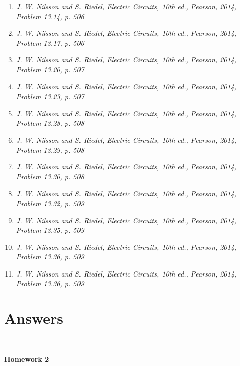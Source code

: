 \documentclass[11pt]{article}
\begin{document}
\begin{enumerate}[leftmargin=*,label=\textbf{3.\arabic*.}]
\item \textit{J. W. Nilsson and S. Riedel, Electric Circuits, 10th ed., Pearson, 2014, Problem 13.14, p. 506}

\item \textit{J. W. Nilsson and S. Riedel, Electric Circuits, 10th ed., Pearson, 2014, Problem 13.17, p. 506}

\item \textit{J. W. Nilsson and S. Riedel, Electric Circuits, 10th ed., Pearson, 2014, Problem 13.20, p. 507}

\item \textit{J. W. Nilsson and S. Riedel, Electric Circuits, 10th ed., Pearson, 2014, Problem 13.23, p. 507}

\item \textit{J. W. Nilsson and S. Riedel, Electric Circuits, 10th ed., Pearson, 2014, Problem 13.28, p. 508}

\item \textit{J. W. Nilsson and S. Riedel, Electric Circuits, 10th ed., Pearson, 2014, Problem 13.29, p. 508}

\item \textit{J. W. Nilsson and S. Riedel, Electric Circuits, 10th ed., Pearson, 2014, Problem 13.30, p. 508}

\item \textit{J. W. Nilsson and S. Riedel, Electric Circuits, 10th ed., Pearson, 2014, Problem 13.32, p. 509}

\item \textit{J. W. Nilsson and S. Riedel, Electric Circuits, 10th ed., Pearson, 2014, Problem 13.35, p. 509}

\item \textit{J. W. Nilsson and S. Riedel, Electric Circuits, 10th ed., Pearson, 2014, Problem 13.36, p. 509}

\item \textit{J. W. Nilsson and S. Riedel, Electric Circuits, 10th ed., Pearson, 2014, Problem 13.36, p. 509}

\end{enumerate}

\newpage

\section{Answers}

\

\textbf{Homework 2}
\end{document}
